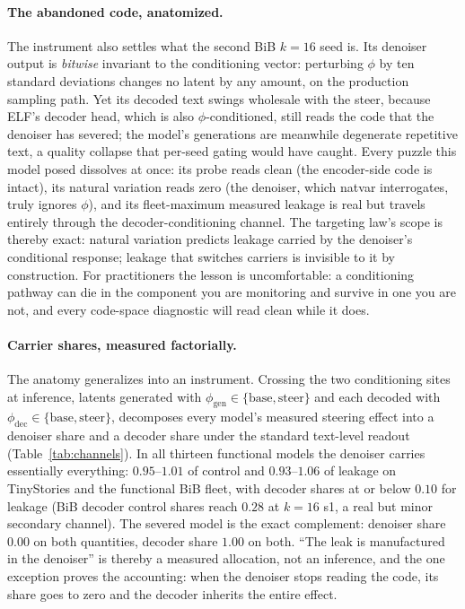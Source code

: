 \documentclass[11pt]{article}
\begin{document}
\paragraph{The abandoned code, anatomized.} The instrument also settles what
the second BiB $k{=}16$ seed is. Its denoiser output is \emph{bitwise}
invariant to the conditioning vector: perturbing $\phi$ by ten standard
deviations changes no latent by any amount, on the production sampling path.
Yet its decoded text swings wholesale with the steer, because ELF's decoder
head, which is also $\phi$-conditioned, still reads the code that the
denoiser has severed; the model's generations are meanwhile degenerate
repetitive text, a quality collapse that per-seed gating would have caught.
Every puzzle this model posed dissolves at once: its probe reads clean
(the encoder-side code is intact), its natural variation reads zero (the
denoiser, which natvar interrogates, truly ignores $\phi$), and its
fleet-maximum measured leakage is real but travels entirely through the
decoder-conditioning channel. The targeting law's scope is thereby exact:
natural variation predicts leakage carried by the denoiser's conditional
response; leakage that switches carriers is invisible to it by construction.
For practitioners the lesson is uncomfortable: a conditioning pathway can
die in the component you are monitoring and survive in one you are not, and
every code-space diagnostic will read clean while it does.

\paragraph{Carrier shares, measured factorially.} The anatomy generalizes
into an instrument. Crossing the two conditioning sites at inference,
latents generated with $\phi_{\mathrm{gen}} \in \{\text{base},
\text{steer}\}$ and each decoded with $\phi_{\mathrm{dec}} \in
\{\text{base}, \text{steer}\}$, decomposes every model's measured steering
effect into a denoiser share and a decoder share under the standard
text-level readout (Table~\ref{tab:channels}). In all thirteen functional
models the denoiser carries essentially everything: $0.95$--$1.01$ of
control and $0.93$--$1.06$ of leakage on TinyStories and the functional BiB
fleet, with decoder shares at or below $0.10$ for leakage (BiB decoder
control shares reach $0.28$ at $k{=}16$ s1, a real but minor secondary
channel). The severed model is the exact complement: denoiser share $0.00$
on both quantities, decoder share $1.00$ on both. ``The leak is
manufactured in the denoiser'' is thereby a measured allocation, not an
inference, and the one exception proves the accounting: when the denoiser
stops reading the code, its share goes to zero and the decoder inherits the
entire effect.
\end{document}
